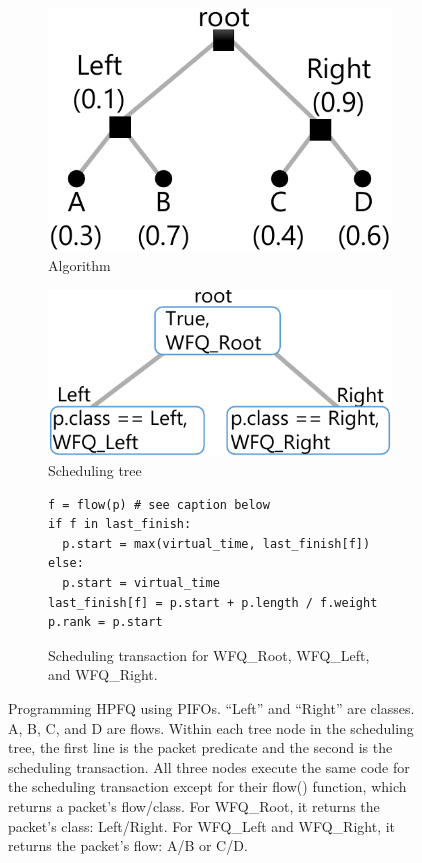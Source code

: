 \begin{figure}[!t]
\begin{subfigure}[b]{.2\textwidth}
\includegraphics[width=\textwidth]{pifo_hpfq_example.pdf}
\caption{Algorithm}
\label{fig:hpfq_algo}
\end{subfigure}
\vrule
\begin{subfigure}[b]{.3\textwidth}
\includegraphics[width=\textwidth]{pifo_hpfq_program.pdf}
\caption{Scheduling tree}
\label{fig:hpfq_tree}
\end{subfigure}
\vrule
\begin{subfigure}[b]{.5\textwidth}
\begin{lstlisting}[style=customc]
f = flow(p) # see caption below
if f in last_finish:
  p.start = max(virtual_time, last_finish[f])
else:
  p.start = virtual_time
last_finish[f] = p.start + p.length / f.weight
p.rank = p.start
\end{lstlisting}
\caption{Scheduling transaction for WFQ\_Root, WFQ\_Left, and
  WFQ\_Right.}
\label{fig:hpfq_trans}
\end{subfigure}
\caption{Programming HPFQ using PIFOs. ``Left'' and ``Right'' are
  classes. A, B, C, and D are flows.  Within each tree node in the scheduling tree, the first
  line is the packet predicate and the second is the scheduling
  transaction. All three nodes execute the same code for the scheduling
  transaction except for their flow() function, which returns a packet's flow/class. For
  WFQ\_Root, it returns the packet's class: Left/Right. For WFQ\_Left
  and WFQ\_Right, it returns the packet's flow: A/B or C/D.}
\label{fig:hpfq}
\end{figure}



